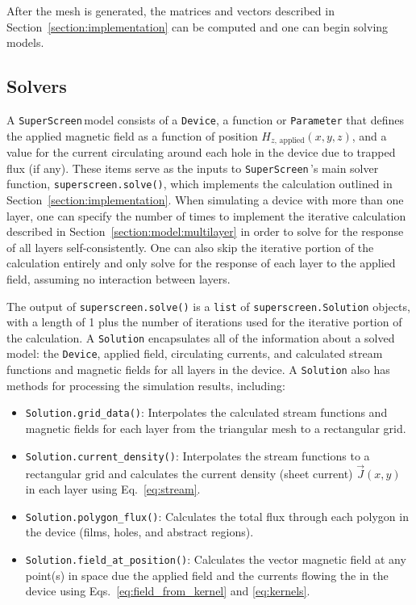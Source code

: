 \documentclass[preprint,12pt]{elsarticle}
\newcommand{\SuperScreen}{\texttt{SuperScreen}\,}
\begin{document}
After the mesh is generated, the matrices and vectors described in Section~\ref{section:implementation} can be computed and one can begin solving models.

\subsection{Solvers}
\label{section:overview:solvers}

A \SuperScreen model consists of a \texttt{Device}, a function or \texttt{Parameter} that defines the applied magnetic field as a function of position $H_{z,\,\mathrm{applied}}(x, y, z)$, and a value for the current circulating around each hole in the device due to trapped flux (if any). These items serve as the inputs to \SuperScreen's main solver function, \texttt{superscreen.solve()}, which implements the calculation outlined in Section~\ref{section:implementation}. When simulating a device with more than one layer, one can specify the number of times to implement the iterative calculation described in Section~\ref{section:model:multilayer} in order to solve for the response of all layers self-consistently. One can also skip the iterative portion of the calculation entirely and only solve for the response of each layer to the applied field, assuming no interaction between layers.

The output of \texttt{superscreen.solve()} is a \texttt{list} of \texttt{superscreen.Solution} objects, with a length of 1 plus the number of iterations used for the iterative portion of the calculation. A \texttt{Solution} encapsulates all of the information about a solved model: the \texttt{Device}, applied field, circulating currents, and calculated stream functions and magnetic fields for all layers in the device. A \texttt{Solution} also has methods for processing the simulation results, including:
\begin{itemize}
    \item{
    \texttt{Solution.grid_data()}: Interpolates the calculated stream functions and magnetic fields for each layer from the triangular mesh to a rectangular grid.
    }
    \item{
    \texttt{Solution.current_density()}: Interpolates the stream functions to a rectangular grid and calculates the current density (sheet current) $\vec{J}(x, y)$ in each layer using Eq.~\ref{eq:stream}.
    }
    \item{
    \texttt{Solution.polygon_flux()}: Calculates the total flux through each polygon in the device (films, holes, and abstract regions).
    }
    \item{
    \texttt{Solution.field_at_position()}: Calculates the vector magnetic field at any point(s) in space due the applied field and the currents flowing the in the device using Eqs.~\ref{eq:field_from_kernel} and \ref{eq:kernels}.
    }
\end{itemize}
\end{document}
